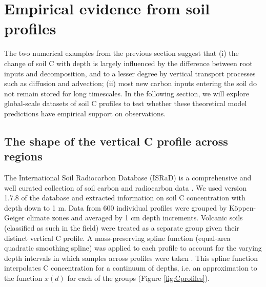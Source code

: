 \documentclass[11pt, oneside, a4paper]{article}   	%
\begin{document}
\section{Empirical evidence from soil profiles}
The two numerical examples from the previous section suggest that (i) the change of soil C with depth is largely influenced by the difference between root inputs and decomposition, and to a lesser degree by vertical transport processes such as diffusion and advection; (ii) most new carbon inputs entering the soil do not remain stored for long timescales. In the following section, we will explore global-scale datasets of soil C profiles to test whether these theoretical model predictions have empirical support on observations.

\subsection{The shape of the vertical C profile across regions}
The International Soil Radiocarbon Database (ISRaD) is a comprehensive and well curated collection of soil carbon and radiocarbon data  \citep{Lawrence2020}. We used version 1.7.8 of the database and extracted information on soil C concentration with depth down to 1 m. Data from 600 individual profiles were grouped by K\"oppen-Geiger climate zones \citep{Beck2018} and averaged by 1 cm depth increments. Volcanic soils (classified as such in the field) were treated as a separate group given their distinct vertical C profile. A mass-preserving spline function (equal-area quadratic smoothing spline) was applied to each profile to account for the varying depth intervals in which samples across profiles were taken \citep{Ponce1986,Bishop1999}. This spline function interpolates C concentration for a continuum of depths, i.e. an approximation to the function $x(d)$ for each of the groups (Figure \ref{fig:Cprofiles}). 
\end{document}
